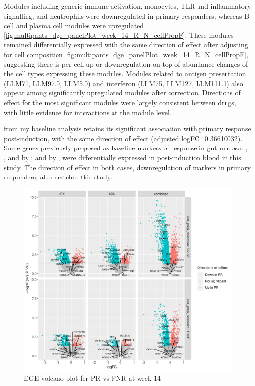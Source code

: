 \begin{outline}
Modules including generic immune activation, monocytes, TLR and inflammatory signalling, and neutrophils were downregulated in primary responders; 
whereas B cell and plasma cell modules were upregulated \autoref{fig:multipants_dge_panelPlot_week_14_R_N_cellPropF}.
These modules remained differentially expressed with the same direction of effect after adjusting for cell composition \autoref{fig:multipants_dge_panelPlot_week_14_R_N_cellPropF}, 
suggesting there is per-cell up or downregulation on top of abundance changes of the cell types expressing these modules.
Modules related to antigen presentation (LI.M71, LI.M97.0, LI.M5.0) and interferon (LI.M75, LI.M127, LI.M111.1) also appear among significantly upregulated modules after correction.
Directions of effect for the most significant modules were largely consistent between drugs, with little evidence for interactions at the module level.

 from my baseline analysis retains its significant association with primary response post-induction, with the same direction of effect (adjusted logFC=\num{0.36610032}).
Some genes previously proposed as baseline markers of response in gut mucosa: , ,  and  by \autocite{arijs2010PredictiveValueEpithelial}; and  by \autocite{west2017OncostatinDrivesIntestinal},
were differentially expressed in post-induction blood in this study.
The direction of effect in both cases, downregulation of markers in primary responders, also matches this study.

\begin{figure}
    \centering
    \includegraphics[width=1.0\textwidth,page=1]{mainmatter/figures/chapter_04/plot_gene_set_enrichment.dge_result_volcano_simple_C_3RI_3NI,C_3RA_3NA,C_3R_3N.pdf}
    \caption{DGE volcano plot for PR vs PNR at week 14}
    \label{fig:multipants_dge_volcano_week_14_R_N}
\end{figure}


\end{outline}
